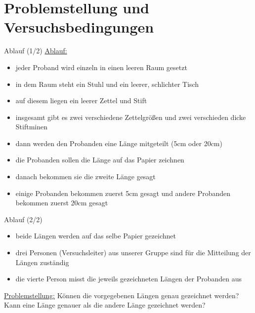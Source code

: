 \documentclass[ ngerman, fontsize= 10pt, headings=big, titlepage=true, xcolor=dvipsnames]{beamer}
\begin{document}
\section{Problemstellung und Versuchsbedingungen}
\begin{frame}{Ablauf (1/2)}
\underline{Ablauf:}
\begin{itemize}
\item jeder Proband wird einzeln in einen leeren Raum gesetzt
\item in dem Raum steht ein Stuhl und ein leerer, schlichter Tisch 
\item auf diesem liegen ein leerer Zettel und Stift
\item insgesamt gibt es zwei verschiedene Zettelgrößen und zwei verschieden dicke Stiftminen
\item dann werden den Probanden eine Länge mitgeteilt (5cm oder 20cm)
\item die Probanden sollen die Länge auf das Papier zeichnen
\item danach bekommen sie die zweite Länge gesagt
\item einige Probanden bekommen zuerst 5cm gesagt und andere Probanden bekommen zuerst 20cm gesagt



\end{itemize}
	
\end{frame}
\begin{frame}{Ablauf (2/2)}
\begin{itemize}
\item beide Längen werden auf das selbe Papier gezeichnet 
\item drei Personen (Versuchsleiter) aus unserer Gruppe sind für die Mitteilung der Längen zuständig 
\item die vierte Person misst die jeweils gezeichneten Längen der Probanden aus
\end{itemize}
\underline{Problemstellung:}\newline
Können die vorgegebenen Längen genau gezeichnet werden? \newline
Kann eine Länge genauer als die andere Länge gezeichnet werden?

\end{frame}
\end{document}
